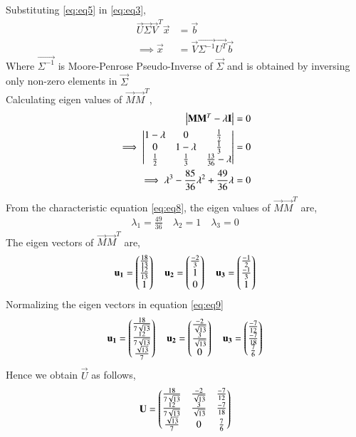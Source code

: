 \documentclass[journal,12pt,twocolumn]{IEEEtran}
\begin{document}
Substituting \eqref{eq:eq5} in \eqref{eq:eq3},
\begin{align}
\vec{U}\vec{\Sigma}\vec{V}^T\vec{x} & = \vec{b}\\
\implies\vec{x} &= \vec{V}\vec{\Sigma^{-1}}\vec{U^T}\vec{b}\label{eq:eq7}
\end{align}
Where $\vec{\Sigma^{-1}}$ is Moore-Penrose Pseudo-Inverse of $\vec{\Sigma}$ and is obtained by inversing only non-zero elements in $\vec{\Sigma}$\\
Calculating eigen values of $\vec{M}\vec{M}^T$,
\begin{align}
\begin{vmatrix}\mathbf{M}\mathbf{M}^T - \lambda\mathbf{I}\end{vmatrix} &= 0\\
\implies\begin{vmatrix}1-\lambda&0&\frac{1}{2}\\0&1-\lambda&\frac{1}{3}\\\frac{1}{2}&\frac{1}{3}&\frac{13}{36}-\lambda\end{vmatrix} &=0\\
\implies \lambda^3-\frac{85}{36}\lambda^2+\frac{49}{36}\lambda&=0 \label{eq:eq8}
\end{align}
From the characteristic equation \eqref{eq:eq8}, the eigen values of $\vec{M}\vec{M}^T$ are,
\begin{align}
\lambda_1 = \frac{49}{36} \quad
\lambda_2 = 1 \quad
\lambda_3 = 0
\end{align}
The eigen vectors of $\vec{M}\vec{M}^T$ are,
\begin{align}
\mathbf{u_1}=\begin{pmatrix}\frac{18}{13}\\\frac{12}{13}\\1\end{pmatrix}\quad
\mathbf{u_2}=\begin{pmatrix}\frac{-2}{3}\\1\\0\end{pmatrix}\quad
\mathbf{u_3}=\begin{pmatrix}\frac{-1}{2}\\\frac{-1}{3}\\1\end{pmatrix}\label{eq:eq9}
\end{align}
Normalizing the eigen vectors in equation \eqref{eq:eq9}
\begin{align}
\mathbf{u_1}=\begin{pmatrix}\frac{18}{7\sqrt{13}}\\\frac{12}{7\sqrt{13}}\\\frac{\sqrt{13}}{7}\end{pmatrix}\quad
\mathbf{u_2}=\begin{pmatrix}\frac{-2}{\sqrt{13}}\\\frac{3}{\sqrt{13}}\\0\end{pmatrix}\quad
\mathbf{u_3}=\begin{pmatrix}\frac{-7}{12}\\\frac{-7}{18}\\\frac{7}{6}\end{pmatrix}
\end{align}
Hence we obtain $\vec{U}$ as follows,
\begin{align}
\mathbf{U}=\begin{pmatrix}\frac{18}{7\sqrt{13}}&\frac{-2}{\sqrt{13}}&\frac{-7}{12}\\\frac{12}{7\sqrt{13}}&\frac{3}{\sqrt{13}}&\frac{-7}{18}\\\frac{\sqrt{13}}{7}&0&\frac{7}{6}\end{pmatrix}\label{eq:eq10}
\end{align}
\end{document}

